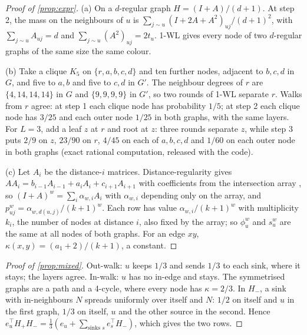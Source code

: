 \documentclass[10pt]{article}
\theoremstyle{definition}
\begin{document}
\begin{proof}[Proof of \cref{prop:expr}]
(a) On a $d$-regular graph $H = (I+A)/(d+1)$. At step 2, the mass on the neighbours of $u$ is $\sum_{j\sim u}(I+2A+A^2)_{uj}/(d+1)^2$, with $\sum_{j\sim u}A_{uj}=d$ and $\sum_{j\sim u}(A^2)_{uj}=2t_u$. 1-WL gives every node of two $d$-regular graphs of the same size the same colour.

(b) Take a clique $K_5$ on $\{r,a,b,c,d\}$ and ten further nodes, adjacent to $b,c,d$ in $G$, and five to $a,b$ and five to $c,d$ in $G'$. The neighbour degrees of $r$ are $\{4,14,14,14\}$ in $G$ and $\{9,9,9,9\}$ in $G'$, so two rounds of 1-WL separate $r$. Walks from $r$ agree: at step 1 each clique node has probability $1/5$; at step 2 each clique node has $3/25$ and each outer node $1/25$ in both graphs, with the same layers. For $L=3$, add a leaf $z$ at $r$ and root at $z$: three rounds separate $z$, while step 3 puts $2/9$ on $z$, $23/90$ on $r$, $4/45$ on each of $a,b,c,d$ and $1/60$ on each outer node in both graphs (exact rational computation, released with the code).

(c) Let $A_i$ be the distance-$i$ matrices. Distance-regularity gives $AA_i = b_{i-1}A_{i-1}+a_iA_i+c_{i+1}A_{i+1}$ with coefficients from the intersection array \citep{brouwer1989}, so $(I+A)^w = \sum_i\alpha_{w,i}A_i$ with $\alpha_{w,i}$ depending only on the array, and $p^w_{uj} = \alpha_{w,d(u,j)}/(k+1)^w$. Each row has value $\alpha_{w,i}/(k+1)^w$ with multiplicity $k_i$, the number of nodes at distance $i$, also fixed by the array; so $\phi^w_u$ and $s^w_u$ are the same at all nodes of both graphs. For an edge $xy$, $\kappa(x,y) = (a_1+2)/(k+1)$, a constant.
\end{proof}

\begin{proof}[Proof of \cref{prop:mixed}]
Out-walk: $u$ keeps $1/3$ and sends $1/3$ to each sink, where it stays; the layers agree. In-walk: $u$ has no in-edge and stays. The symmetrised graphs are a path and a 4-cycle, where every node has $\kappa=2/3$. In $H_-$, a sink with in-neighbours $N$ spreads uniformly over itself and $N$: $1/2$ on itself and $u$ in the first graph, $1/3$ on itself, $u$ and the other source in the second. Hence $e_u^\top H_+H_- = \frac13(e_u+\sum_{\text{sinks } s}e_s^\top H_-)$, which gives the two rows.
\end{proof}
\end{document}
